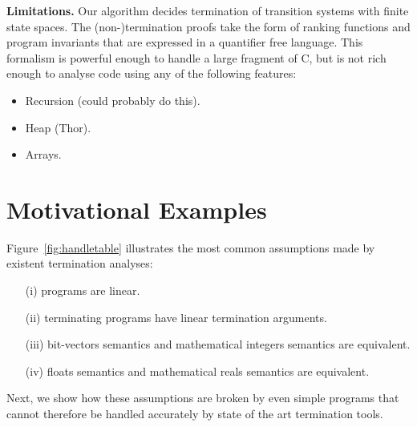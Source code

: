 \documentclass[preprint]{sigplanconf}
\theoremstyle{definition}
\begin{document}





{\bf Limitations.}
Our algorithm decides termination of transition systems with finite state spaces.
The (non-)termination proofs take the form of ranking functions and program invariants
that are expressed in a quantifier free language.  This formalism is powerful
enough to handle a large fragment of C, but is not rich enough to analyse
code using any of the following features:

\begin{itemize}
\item Recursion (could probably do this).
\item Heap (Thor).
\item Arrays.
\end{itemize}




\section{Motivational Examples} \label{sec:motivation}
Figure~\ref{fig:handletable} illustrates the most common assumptions made by existent termination analyses:
\begin{itemize}
\item[(i)] programs are linear.
\item[(ii)] terminating programs have linear termination arguments.
\item[(iii)] bit-vectors semantics and mathematical integers semantics are equivalent.
\item[(iv)] floats semantics and mathematical reals semantics are equivalent.
\end{itemize}  

Next, we show how these assumptions are broken by even simple programs that cannot therefore be handled accurately by state of the art termination tools.
\end{document}
